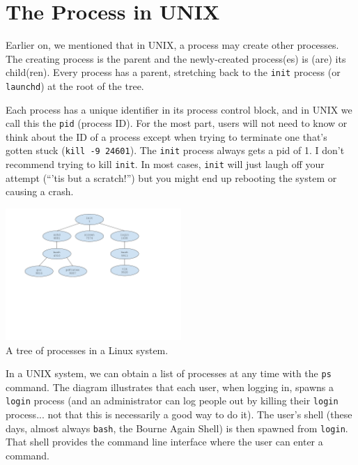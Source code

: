 




\section*{The Process in UNIX}

Earlier on, we mentioned  that in UNIX, a process may create other processes. The creating process is the parent and the newly-created process(es) is (are) its child(ren). Every process has a parent, stretching back to the \texttt{init} process (or \texttt{launchd}) at the root of the tree.

Each process has a unique identifier in its process control block, and in UNIX we call this the \texttt{pid} (process ID). For the most part, users will not need to know or think about the ID of a process except when trying to terminate one that's gotten stuck (\texttt{kill -9 24601}). The \texttt{init} process always gets a pid of 1. I don't recommend trying to kill \texttt{init}. In most cases, \texttt{init} will just laugh off your attempt (``'tis but a scratch!'') but you might end up rebooting the system or causing a crash.

\begin{center}
	\includegraphics[width=0.5\textwidth]{images/linux-process-tree.pdf}\\
	A tree of processes in a Linux system.
\end{center}

In a UNIX system, we can obtain a list of processes at any time with the \texttt{ps} command. The diagram illustrates that each user, when logging in, spawns a \texttt{login} process (and an administrator can log people out by killing their \texttt{login} process... not that this is necessarily a good way to do it). The user's shell (these days, almost always \texttt{bash}, the Bourne Again Shell) is then spawned from \texttt{login}. That shell provides the command line interface where the user can enter a command.

